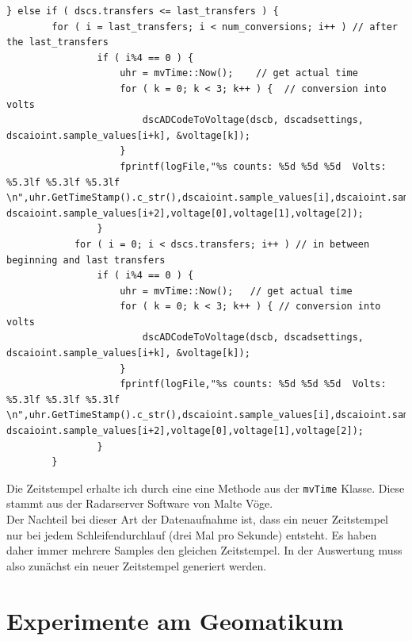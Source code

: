 \documentclass[12pt,a4paper]{scrartcl}
\begin{document}
\begin{lstlisting}[frame=trBL]				
	} else if ( dscs.transfers <= last_transfers ) {
		for ( i = last_transfers; i < num_conversions; i++ ) // after the last_transfers
				if ( i%4 == 0 ) {
					uhr = mvTime::Now();    // get actual time
					for ( k = 0; k < 3; k++ ) {  // conversion into volts
						dscADCodeToVoltage(dscb, dscadsettings, dscaioint.sample_values[i+k], &voltage[k]);
					}
					fprintf(logFile,"%s counts: %5d %5d %5d  Volts: %5.3lf %5.3lf %5.3lf \n",uhr.GetTimeStamp().c_str(),dscaioint.sample_values[i],dscaioint.sample_values[i+1], dscaioint.sample_values[i+2],voltage[0],voltage[1],voltage[2]);
				}
            for ( i = 0; i < dscs.transfers; i++ ) // in between beginning and last transfers
				if ( i%4 == 0 ) {
					uhr = mvTime::Now();   // get actual time
					for ( k = 0; k < 3; k++ ) { // conversion into volts
						dscADCodeToVoltage(dscb, dscadsettings, dscaioint.sample_values[i+k], &voltage[k]);
					}
					fprintf(logFile,"%s counts: %5d %5d %5d  Volts: %5.3lf %5.3lf %5.3lf \n",uhr.GetTimeStamp().c_str(),dscaioint.sample_values[i],dscaioint.sample_values[i+1], dscaioint.sample_values[i+2],voltage[0],voltage[1],voltage[2]);
				}
        }
\end{lstlisting}

Die Zeitstempel erhalte ich durch eine eine Methode aus der \texttt{mvTime} Klasse. Diese stammt aus der Radarserver Software von Malte Vöge. \\

Der Nachteil bei dieser Art der Datenaufnahme ist, dass ein neuer Zeitstempel nur bei jedem Schleifendurchlauf (drei Mal pro Sekunde) entsteht. Es haben daher immer mehrere Samples den gleichen Zeitstempel. In der Auswertung muss also zunächst ein neuer Zeitstempel generiert werden.

\newpage

\section{Experimente am Geomatikum}
\end{document}
